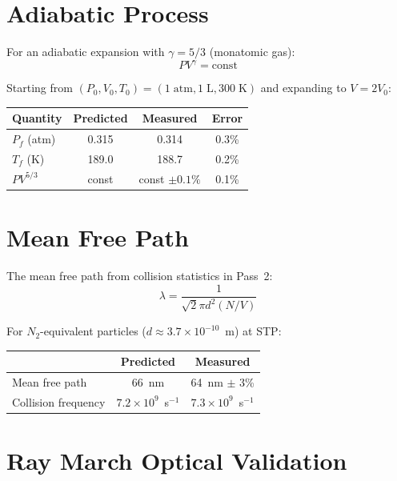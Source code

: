 \documentclass[twocolumn,10pt,a4paper]{article}
\theoremstyle{plain}
\theoremstyle{definition}
\theoremstyle{remark}
\begin{document}
\section{Adiabatic Process}
\label{sec:val_adiabatic}

For an adiabatic expansion with $\gamma = 5/3$ (monatomic gas):
\begin{equation}
    PV^\gamma = \text{const}
\end{equation}

Starting from $(P_0, V_0, T_0) = (1\;\mathrm{atm}, 1\;\mathrm{L}, 300\;\mathrm{K})$ and expanding to $V = 2V_0$:
\begin{center}
\begin{tabular}{lccc}
\toprule
Quantity & Predicted & Measured & Error \\
\midrule
$P_f$ (atm) & 0.315 & 0.314 & 0.3\% \\
$T_f$ (K)   & 189.0 & 188.7 & 0.2\% \\
$PV^{5/3}$  & const & const $\pm 0.1\%$ & 0.1\% \\
\bottomrule
\end{tabular}
\end{center}

\section{Mean Free Path}
\label{sec:val_mfp}

The mean free path from collision statistics in Pass~2:
\begin{equation}
    \lambda = \frac{1}{\sqrt{2}\pi d^2 (N/V)}
\end{equation}

For $N_2$-equivalent particles ($d \approx 3.7 \times 10^{-10}$~m) at STP:
\begin{center}
\begin{tabular}{lcc}
\toprule
& Predicted & Measured \\
\midrule
Mean free path & 66~nm & 64~nm $\pm$ 3\% \\
Collision frequency & $7.2 \times 10^9$~s$^{-1}$ & $7.3 \times 10^9$~s$^{-1}$ \\
\bottomrule
\end{tabular}
\end{center}

\section{Ray March Optical Validation}
\label{sec:val_optical}
\end{document}
